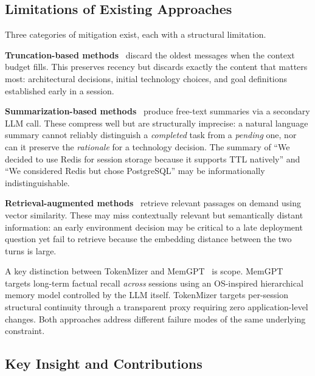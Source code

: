 \documentclass[journal]{IEEEtran}
\begin{document}
\subsection{Limitations of Existing Approaches}

Three categories of mitigation exist, each with a structural
limitation.

\textbf{Truncation-based methods}~\cite{brownfewshot} discard
the oldest messages when the context budget fills.
This preserves recency but discards exactly the content
that matters most: architectural decisions, initial technology
choices, and goal definitions established early in a session.

\textbf{Summarization-based methods}~\cite{langchain,acc}
produce free-text summaries via a secondary LLM call.
These compress well but are structurally imprecise: a natural
language summary cannot reliably distinguish a \emph{completed}
task from a \emph{pending} one, nor can it preserve the
\emph{rationale} for a technology decision.
The summary of ``We decided to use Redis for session storage
because it supports TTL natively'' and ``We considered Redis
but chose PostgreSQL'' may be informationally indistinguishable.

\textbf{Retrieval-augmented methods}~\cite{rag,memgpt}
retrieve relevant passages on demand using vector similarity.
These may miss contextually relevant but semantically distant
information: an early environment decision may be critical to
a late deployment question yet fail to retrieve because the
embedding distance between the two turns is large.

A key distinction between TokenMizer and MemGPT~\cite{memgpt}
is scope. MemGPT targets long-term factual recall
\emph{across} sessions using an OS-inspired hierarchical
memory model controlled by the LLM itself. TokenMizer targets
per-session structural continuity through a transparent
proxy requiring zero application-level changes.
Both approaches address different failure modes of the same
underlying constraint.

\subsection{Key Insight and Contributions}
\end{document}
